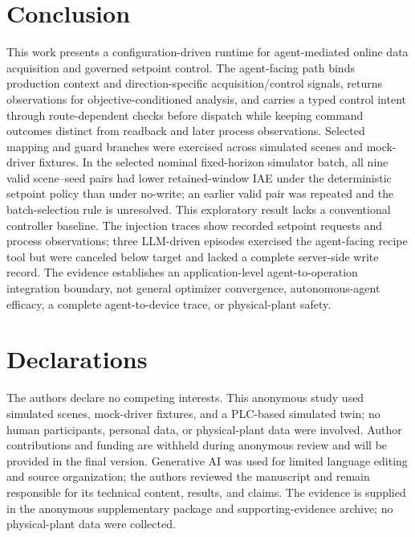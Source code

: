 \documentclass[journal]{IEEEtran}
\begin{document}
\section{Conclusion}
\label{sec:conclusion}
This work presents a configuration-driven runtime for agent-mediated online data acquisition and governed setpoint control. The agent-facing path binds production context and direction-specific acquisition/control signals, returns observations for objective-conditioned analysis, and carries a typed control intent through route-dependent checks before dispatch while keeping command outcomes distinct from readback and later process observations. Selected mapping and guard branches were exercised across simulated scenes and mock-driver fixtures. In the selected nominal fixed-horizon simulator batch, all nine valid scene--seed pairs had lower retained-window IAE under the deterministic setpoint policy than under no-write; an earlier valid pair was repeated and the batch-selection rule is unresolved. This exploratory result lacks a conventional controller baseline. The injection traces show recorded setpoint requests and process observations; three LLM-driven episodes exercised the agent-facing recipe tool but were canceled below target and lacked a complete server-side write record. The evidence establishes an application-level agent-to-operation integration boundary, not general optimizer convergence, autonomous-agent efficacy, a complete agent-to-device trace, or physical-plant safety.
 
\section*{Declarations}
The authors declare no competing interests. This anonymous study used simulated scenes, mock-driver fixtures, and a PLC-based simulated twin; no human participants, personal data, or physical-plant data were involved. Author contributions and funding are withheld during anonymous review and will be provided in the final version. Generative AI was used for limited language editing and source organization; the authors reviewed the manuscript and remain responsible for its technical content, results, and claims. The evidence is supplied in the anonymous supplementary package and supporting-evidence archive; no physical-plant data were collected.



\end{document}
